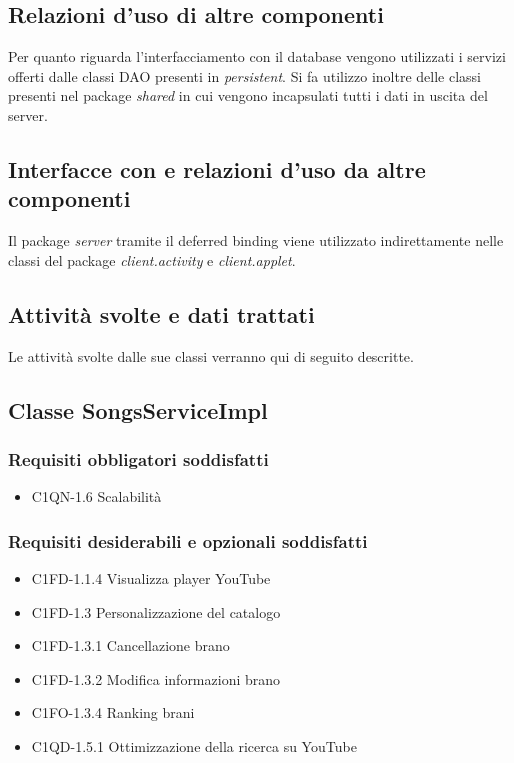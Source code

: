 \subsection*{Relazioni d'uso di altre componenti}
Per quanto riguarda l'interfacciamento con il database vengono utilizzati i
servizi offerti dalle classi DAO presenti in \emph{persistent}. Si fa utilizzo
inoltre delle classi presenti nel package \emph{shared} in cui vengono
incapsulati tutti i dati in uscita del server.
\subsection*{Interfacce con e relazioni d'uso da altre componenti}
Il package \emph{server} tramite il deferred binding viene utilizzato
indirettamente nelle classi del package \emph{client.activity} e
\emph{client.applet}. 
\subsection*{Attivit\`a svolte e dati trattati}
Le attivit\`a svolte dalle sue classi verranno qui di seguito descritte.

\subsection{Classe SongsServiceImpl}
\subsubsection*{Requisiti obbligatori soddisfatti}
\begin{itemize}
    \item C1QN-1.6 Scalabilit\`a
\end{itemize}
\subsubsection*{Requisiti desiderabili e opzionali soddisfatti}
\begin{itemize}
    \item C1FD-1.1.4 Visualizza player YouTube
    \item C1FD-1.3 Personalizzazione del catalogo
    \item C1FD-1.3.1 Cancellazione brano
    \item C1FD-1.3.2 Modifica informazioni brano
    \item C1FO-1.3.4 Ranking brani
    \item C1QD-1.5.1 Ottimizzazione della ricerca su YouTube
\end{itemize}
